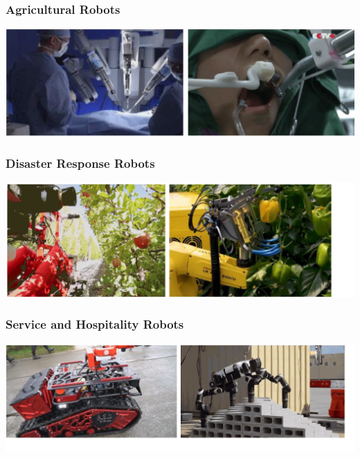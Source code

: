 \documentclass[10pt]{article}
\begin{document}
\subsubsection*{Agricultural Robots}
\begin{center} 
	\includegraphics*[width=\textwidth]{L1_4.png} 
\end{center}
\subsubsection*{Disaster Response Robots}
\begin{center} 
	\includegraphics*[width=\textwidth]{L1_5.png} 
\end{center}
\subsubsection*{Service and Hospitality Robots}
\begin{center} 
	\includegraphics*[width=\textwidth]{L1_6.png} 
\end{center}
\end{document}
